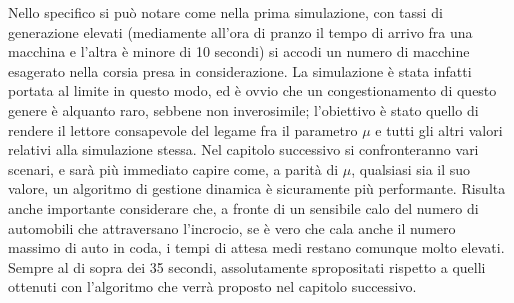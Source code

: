 Nello specifico si può notare come nella prima simulazione, con tassi di generazione elevati (mediamente all'ora di pranzo il tempo di arrivo fra una macchina e l'altra è minore di 10 secondi) si accodi un numero di macchine esagerato nella corsia presa in considerazione. La simulazione è stata infatti portata al limite in questo modo, ed è ovvio che un congestionamento di questo genere è alquanto raro, sebbene non inverosimile; l'obiettivo è stato quello di rendere il lettore consapevole del legame fra il parametro $\mu$ e tutti gli altri valori relativi alla simulazione stessa. Nel capitolo successivo si confronteranno vari scenari, e sarà più immediato capire come, a parità di $\mu$, qualsiasi sia il suo valore, un algoritmo di gestione dinamica è sicuramente più performante.
Risulta anche importante considerare che, a fronte di un sensibile calo del numero di automobili che attraversano l'incrocio, se è vero che cala anche il numero massimo di auto in coda, i tempi di attesa medi restano comunque molto elevati. Sempre al di sopra dei 35 secondi, assolutamente spropositati rispetto a quelli ottenuti con l'algoritmo che verrà proposto nel capitolo successivo.


